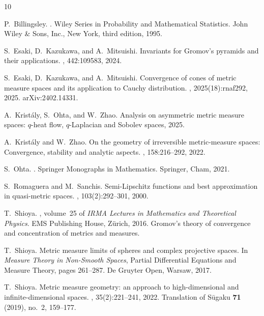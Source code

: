 \documentclass{amsart}
\numberwithin{equation}{section}
\theoremstyle{plain}
\theoremstyle{definition}
\theoremstyle{remark}
\begin{document}
\begin{thebibliography}{10}

P.~Billingsley.
.
\newblock Wiley Series in Probability and Mathematical Statistics. John Wiley
  \& Sons, Inc., New York, third edition, 1995.

S.~Esaki, D.~Kazukawa, and A.~Mitsuishi.
\newblock Invariants for {G}romov's pyramids and their applications.
, 442:109583, 2024.

S.~Esaki, D.~Kazukawa, and A.~Mitsuishi.
\newblock Convergence of cones of metric measure spaces and its application to
  {C}auchy distribution.
, 2025(18):rnaf292, 2025.
\newblock arXiv:2402.14331.

A.~Krist{\'a}ly, S.~Ohta, and W.~Zhao.
\newblock Analysis on asymmetric metric measure spaces: {$q$}-heat flow,
  {$q$}-{Laplacian} and {Sobolev} spaces, 2025.

A.~Krist{\'a}ly and W.~Zhao.
\newblock On the geometry of irreversible metric-measure spaces: Convergence,
  stability and analytic aspects.
,
  158:216--292, 2022.

S.~Ohta.
.
\newblock Springer Monographs in Mathematics. Springer, Cham, 2021.

S.~Romaguera and M.~Sanchis.
\newblock Semi-{Lipschitz} functions and best approximation in quasi-metric
  spaces.
, 103(2):292--301, 2000.

T.~Shioya.
, volume~25 of {\em IRMA Lectures in
  Mathematics and Theoretical Physics}.
\newblock EMS Publishing House, Z\"urich, 2016.
\newblock Gromov's theory of convergence and concentration of metrics and
  measures.

T.~Shioya.
\newblock Metric measure limits of spheres and complex projective spaces.
\newblock In {\em Measure Theory in Non-Smooth Spaces}, Partial Differential
  Equations and Measure Theory, pages 261--287. De Gruyter Open, Warsaw, 2017.

T.~Shioya.
\newblock Metric measure geometry: an approach to high-dimensional and
  infinite-dimensional spaces.
, 35(2):221--241, 2022.
\newblock Translation of S\={u}gaku \textbf{71} (2019), no.~2, 159--177.


\end{thebibliography}
\end{document}
